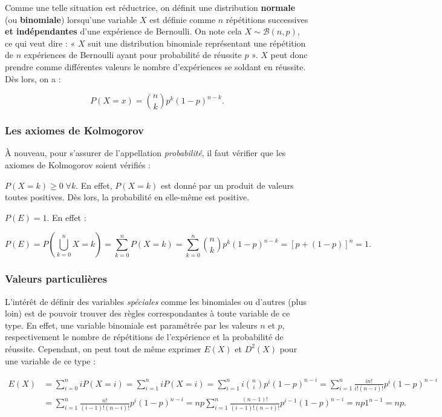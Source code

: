 \documentclass{article}
\begin{document}
		Comme une telle situation est réductrice, on définit une distribution \textbf{normale} (ou \textbf{binomiale}) lorsqu'une variable $X$ est définie comme
		$n$ répétitions successives \textbf{et indépendantes} d'une expérience de Bernoulli. On note cela $X \sim \mathcal B(n, p)$, ce qui veut dire : « $X$ suit une
		distribution binomiale représentant une répétition de $n$ expériences de Bernoulli ayant pour probabilité de réussite $p$ ». $X$ peut donc prendre comme différentes
		valeurs le nombre d'expériences se soldant en réussite. Dès lors, on a :

		\[P(X = x) = \binom nkp^k(1-p)^{n-k}.\]

		\subsubsection{Les axiomes de Kolmogorov}
			À nouveau, pour s'assurer de l'appellation \textit{probabilité}, il faut vérifier que les axiomes de Kolmogorov soient vérifiés :

			$P(X=k) \geq 0 \; \forall k$. En effet, $P(X=k)$ est donné par un produit de valeurs toutes positives. Dès lors, la probabilité en elle-même est positive.

			$P(E) = 1.$ En effet :

			\[P(E) = P\left(\bigcup_{k=0}^nX=k\right) = \sum_{k=0}^nP(X=k) = \sum_{k=0}^n\binom nkp^k(1-p)^{n-k} = \left[p + (1-p)\right]^n = 1.\]

		\subsubsection{Valeurs particulières}
			L'intérêt de définir des variables \textit{spéciales} comme les binomiales ou d'autres (plus loin) est de pouvoir trouver des règles correspondantes
			à toute variable de ce type. En effet, une variable binomiale est paramétrée par les valeurs $n$ et $p$, respectivement le nombre de répétitions de l'expérience
			et la probabilité de réussite. Cependant, on peut tout de même exprimer $E(X)$ et $D^2(X)$ pour une variable de ce type :

			\[\begin{aligned}
				E(X) &= \sum_{i=0}^niP(X=i) = \sum_{i=1}^niP(X=i) = \sum_{i=1}^ni\binom nip^i(1-p)^{n-i} = \sum_{i=1}^n\frac {in!}{i!(n-i)!}p^i(1-p)^{n-i} \\
				&= \sum_{i=1}^n\frac {n!}{(i-1)!(n-i)!}p^i(1-p)^{n-i} = np\sum_{i=1}^n\frac {(n-1)!}{(i-1)!(n-i)!}p^{i-1}(1-p)^{n-i} = np1^{n-1} = np.
			\end{aligned}\]
\end{document}
